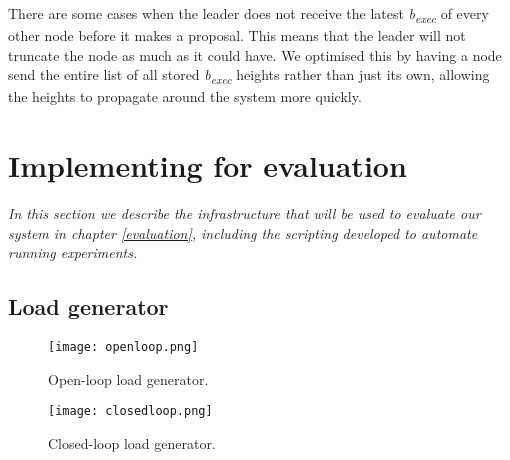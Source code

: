 There are some cases when the leader does not receive the latest \textit{b\textsubscript{exec}} of every other node before it makes a proposal. This means that the leader will not truncate the node as much as it could have. We optimised this by having a node send the entire list of all stored \textit{b\textsubscript{exec}} heights rather than just its own, allowing the heights to propagate around the system more quickly.



\section{Implementing for evaluation} \label{benchcode}

\textit{In this section we describe the infrastructure that will be used to evaluate our system in chapter \ref{evaluation}, including the scripting developed to automate running experiments.}

\subsection{Load generator} \label{loadgenerator}

\begin{figure}[h]
\centering
\texttt{[image: openloop.png]}
\caption{Open-loop load generator.}
\label{openloop}
\end{figure}

\begin{figure}[h]
\centering
\texttt{[image: closedloop.png]}
\caption{Closed-loop load generator.}
\label{closedloop}
\end{figure}

